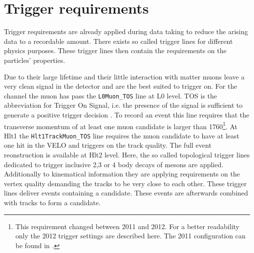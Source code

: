 \section{Trigger requirements}
Trigger requirements are already applied during data taking to reduce the arising data to a recordable amount.
There exists so called trigger lines for different physics purposes. 
These trigger lines then contain the requirements on the particles' properties.

Due to their large lifetime and their little interaction with matter muons leave a very clean signal in the detector and are the best suited to trigger on. For the \LbToDpmunuX channel the muon has pass the \texttt{L0Muon\_TOS} line at L0 level. TOS is the abbreviation for Trigger On Signal, i.e. the presence of the signal is sufficient to generate a positive trigger decision \cite{Tolk:1701134}. 
To record an event this line requires that the transverse momentum of at least one muon candidate is larger than 1760\mev\footnote{This requirement changed between 2011 and 2012. For a better readability only the 2012 trigger settings are described here. The 2011 configuration can be found in \cite{Trigger_2011_2012}.}.
At Hlt1 the \texttt{Hlt1TrackMuon\_TOS} line requires the muon candidate to have at least one hit in the VELO and triggers on the track quality.
The full event reonstruction is available at Hlt2 level.
Here, the so called topological trigger lines dedicated to trigger inclusive 2,3 or 4 body decays of \B mesons are applied.
Additionally to kinematical information they are applying requirements on the vertex quality demanding the tracks to be very close to each other.
These trigger lines deliver events containing a \Dz\mun candidate.
These events are afterwards combined with \proton tracks to form a \LbToDpmunuX candidate.

